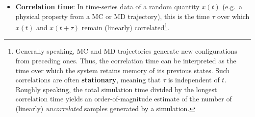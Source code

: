 \begin{itemize}

\item {\bf Correlation time}: In time-series data of a random quantity $x(t)$ (e.g.\ a physical property from a MC or MD trajectory), this is the time $\tau$ over which $x(t)$ and $x(t+\tau)$ remain (linearly) correlated\footnote{Generally speaking, MC and MD trajectories generate new configurations from preceding ones.
Thus, the correlation time can be interpreted as the time over which the system retains memory of its previous states.
Such correlations are often {\bf stationary}, meaning that $\tau$ is independent of $t$.
Roughly speaking, the total simulation time divided by the longest correlation time yields an order-of-magnitude estimate of the number of (linearly) {\it uncorrelated} samples generated by a simulation.}.
\label{def:corr_time}

%



\end{itemize}
